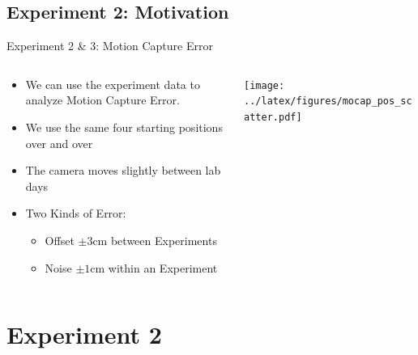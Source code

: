 \documentclass[16:9,en,navbarinfooter]{sdqbeamer}
\begin{document}
\subsection{Experiment 2: Motivation}
\begin{frame}{Experiment 2 \& 3: Motion Capture Error}

	\vspace{1cm}
	\begin{columns}
		\begin{column}{0.3\textwidth}
			\begin{itemize}
				\item We can use the experiment data to analyze Motion Capture Error.
				\item We use the same four starting positions over and over
				\item The camera moves slightly between lab days
				\item Two Kinds of Error:
				      \begin{itemize}
					      \item Offset $\pm 3$cm between Experiments
					      \item Noise $\pm 1$cm within an Experiment
				      \end{itemize}
			\end{itemize}
		\end{column}
		\begin{column}{0.7\textwidth}
			\texttt{[image: ../latex/figures/mocap\_pos\_scatter.pdf]} \\
		\end{column}
	\end{columns}
\end{frame}
\section{Experiment 2}
\end{document}
